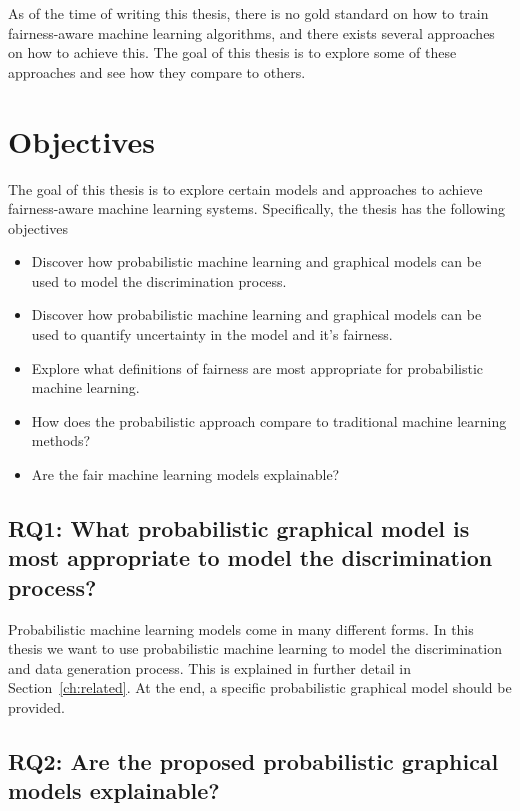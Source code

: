 As of the time of writing this thesis, there is no gold standard on how to train fairness-aware machine learning algorithms, and there exists several approaches on how to achieve this. \citep{Mehrabi:2021:CSUR} The goal of this thesis is to explore some of these approaches and see how they compare to others. 

\section{Objectives}
\label{sec:intro:objectives}

The goal of this thesis is to explore certain models and approaches to achieve fairness-aware machine learning systems. Specifically, the thesis has the following objectives

\begin{itemize}
    \item Discover how probabilistic machine learning and graphical models can be used to model the discrimination process.
    \item Discover how probabilistic machine learning and graphical models can be used to quantify uncertainty in the model and it's fairness.
    \item Explore what definitions of fairness are most appropriate for probabilistic machine learning.
    \item How does the probabilistic approach compare to traditional machine learning methods?
    \item Are the fair machine learning models explainable?
\end{itemize}

\subsection{RQ1: What probabilistic graphical model is most appropriate to model the discrimination process?}

Probabilistic machine learning models come in many different forms. In this thesis we want to use probabilistic machine learning to model the discrimination and data generation process. This is explained in further detail in Section~\ref{ch:related}. At the end, a specific probabilistic graphical model should be provided.

\subsection{RQ2: Are the proposed probabilistic graphical models explainable?}


